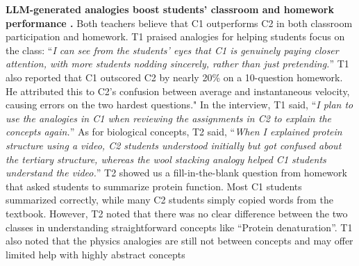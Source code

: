   \textbf{LLM-generated analogies boost students' classroom and homework performance .}
Both teachers believe that C1 outperforms C2 in both classroom participation and homework.
T1 praised analogies for helping students focus on the class: ``\textit{I can see from the students' eyes that C1 is genuinely paying closer attention, with more students nodding sincerely, rather than just pretending.}''
T1 also reported that C1 outscored C2 by nearly 20\% on a 10-question homework.
He attributed this to C2's confusion between average and instantaneous velocity, causing errors on the two hardest questions."
In the interview, T1 said, ``\textit{I plan to use the analogies in C1 when reviewing the assignments in C2 to explain the concepts again.}''
As for biological concepts, T2 said, ``\textit{When I explained protein structure using a video, C2 students understood initially but got confused about the tertiary structure, whereas the wool stacking analogy helped C1 students understand the video.}'' 
T2 showed us a fill-in-the-blank question from homework that asked students to summarize protein function. 
Most C1 students summarized correctly, while many C2 students simply copied words from the textbook. 
However, T2 noted that there was no clear difference between the two classes in understanding straightforward concepts like ``Protein denaturation''.
T1 also noted that the physics analogies are still not between concepts and may offer limited help with highly abstract concepts



